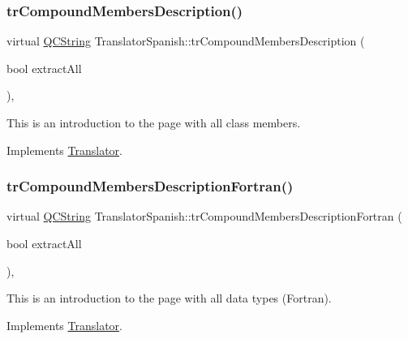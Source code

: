 \subsubsection{\texorpdfstring{trCompoundMembersDescription()}{trCompoundMembersDescription()}}
{\footnotesize\ttfamily virtual \mbox{\hyperlink{class_q_c_string}{Q\+C\+String}} Translator\+Spanish\+::tr\+Compound\+Members\+Description (\begin{DoxyParamCaption}\item[{bool}]{extract\+All }\end{DoxyParamCaption})\hspace{0.3cm}{\ttfamily [inline]}, {\ttfamily [virtual]}}

This is an introduction to the page with all class members. 

Implements \mbox{\hyperlink{class_translator}{Translator}}.

\mbox{\label{class_translator_spanish_a44ba673fdea856ebe32b2c6a84506174}} 
\subsubsection{\texorpdfstring{trCompoundMembersDescriptionFortran()}{trCompoundMembersDescriptionFortran()}}
{\footnotesize\ttfamily virtual \mbox{\hyperlink{class_q_c_string}{Q\+C\+String}} Translator\+Spanish\+::tr\+Compound\+Members\+Description\+Fortran (\begin{DoxyParamCaption}\item[{bool}]{extract\+All }\end{DoxyParamCaption})\hspace{0.3cm}{\ttfamily [inline]}, {\ttfamily [virtual]}}

This is an introduction to the page with all data types (Fortran). 

Implements \mbox{\hyperlink{class_translator}{Translator}}.

\mbox{\label{class_translator_spanish_a0387b35e6a828757b90ccdcee4f461b8}} 
